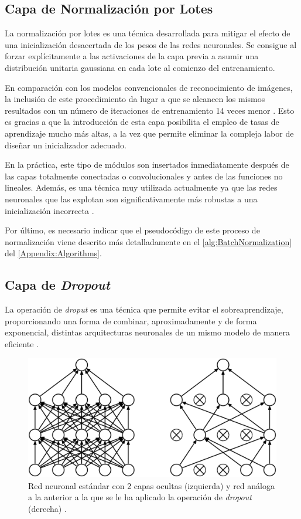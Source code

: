 \subsection{Capa de Normalización por Lotes}

La normalización por lotes es una técnica desarrollada para mitigar el efecto de una inicialización desacertada de los pesos de las redes neuronales. Se consigue al forzar explícitamente a las activaciones de la capa previa a asumir una distribución unitaria gaussiana en cada lote al comienzo del entrenamiento.

En comparación con los modelos convencionales de reconocimiento de imágenes, la inclusión de este procedimiento da lugar a que se alcancen los mismos resultados con un número de iteraciones de entrenamiento 14 veces menor \cite{BatchNormalization}. Esto es gracias a que la introducción de esta capa posibilita el empleo de tasas de aprendizaje mucho más altas, a la vez que permite eliminar la compleja labor de diseñar un inicializador adecuado.

En la práctica, este tipo de módulos son insertados inmediatamente después de las capas totalmente conectadas o convolucionales y antes de las funciones no lineales. Además, es una técnica muy utilizada actualmente ya que las redes neuronales que las explotan son significativamente más robustas a una inicialización incorrecta \cite{CS231n}.

Por último, es necesario indicar que el pseudocódigo de este proceso de normalización viene descrito más detalladamente en el \autoref{alg:BatchNormalization} del \autoref{Appendix:Algorithms}.

\subsection{Capa de \textit{Dropout}}

La operación de \textit{droput} es una técnica que permite evitar el sobreaprendizaje, proporcionando una forma de combinar, aproximadamente y de forma exponencial, distintas arquitecturas neuronales de un mismo modelo de manera eficiente \cite{Srivastava}. 

\begin{figure}
    \centering
    \includegraphics[scale=0.2]{Images/Dropout.png}
    \caption{Red neuronal estándar con 2 capas ocultas (izquierda) y red análoga a la anterior a la que se le ha aplicado la operación de \textit{dropout} (derecha) \cite{Srivastava}.}
    \label{fig:Dropout}
\end{figure}

